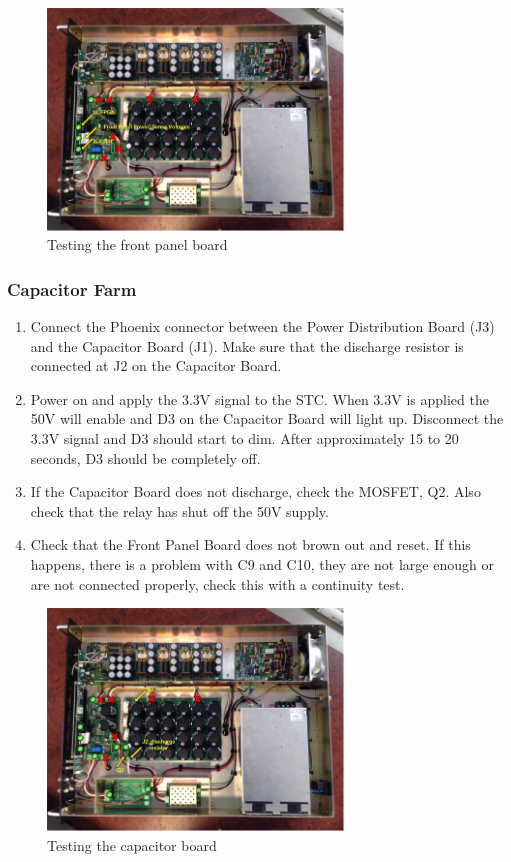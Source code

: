 \begin{figure}[H]
	\centering
	\includegraphics[width=0.7\textwidth]{images/hardware/box_fp.jpg}
	\caption{Testing the front panel board}
	\label{fig:hw_box_fp}
\end{figure}

\subsubsection{Capacitor Farm}

\begin{enumerate}
	\item Connect the Phoenix connector between the Power Distribution Board (J3) and the Capacitor Board (J1).  Make sure that the discharge resistor is connected at J2 on the Capacitor Board.
	\item Power on and apply the 3.3V signal to the STC. When 3.3V is applied the 50V will enable and D3 on the Capacitor Board will light up. Disconnect the 3.3V signal and D3 should start to dim. After approximately 15 to 20 seconds, D3 should be completely off.
	\item If the Capacitor Board does not discharge, check the MOSFET, Q2. Also check that the relay has shut off the 50V supply.
	\item Check that the Front Panel Board does not brown out and reset. If this happens, there is a problem with C9 and C10, they are not large enough or are not connected properly, check this with a continuity test.
\end{enumerate}

\begin{figure}[H]
	\centering
	\includegraphics[width=0.7\textwidth]{images/hardware/box_cap.jpg}
	\caption{Testing the capacitor board}
	\label{fig:hw_box_cap}
\end{figure}

